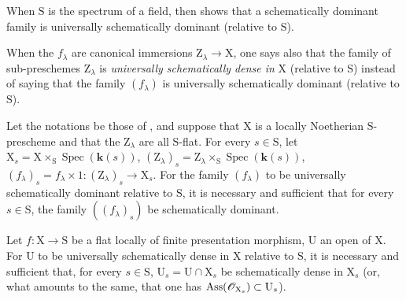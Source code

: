 When $\mathrm{S}$ is the spectrum of a field,  then shows that a schematically dominant family is universally schematically dominant (relative to $\mathrm{S}$).

When the $f_\lambda$ are canonical immersions $\mathrm{Z}_\lambda\to\mathrm{X}$, one says also that the family of sub-preschemes $\mathrm{Z}_\lambda$ is \emph{universally schematically dense in} $\mathrm{X}$ (relative to $\mathrm{S}$) instead of saying that the family $(f_\lambda)$ is universally schematically dominant (relative to $\mathrm{S}$).

\begin{theorem}[11.10.9]
\label{IV.11.10.9}
Let the notations be those of , and suppose that $\mathrm{X}$ is a locally Noetherian $\mathrm{S}$-prescheme and that the $\mathrm{Z}_\lambda$ are all $\mathrm{S}$-flat.
For every $s\in\mathrm{S}$, let $\mathrm{X}_s=\mathrm{X}\times_\mathrm{S}\operatorname{Spec}(\boldsymbol{k}(s))$, $(\mathrm{Z}_\lambda)_s=\mathrm{Z}_\lambda\times_\mathrm{S}\operatorname{Spec}(\boldsymbol{k}(s))$, $(f_\lambda)_s=f_\lambda\times 1:(\mathrm{Z}_\lambda)_s\to\mathrm{X}_s$.
For the family $(f_\lambda)$ to be universally schematically dominant relative to $\mathrm{S}$, it is necessary and sufficient that for every $s\in\mathrm{S}$, the family $((f_\lambda)_s)$ be schematically dominant.
\end{theorem}

\begin{proposition}[11.10.10]
\label{IV.11.10.10}
Let $f:\mathrm{X}\to\mathrm{S}$ be a flat locally of finite presentation morphism, $\mathrm{U}$ an open of $\mathrm{X}$.
For $\mathrm{U}$ to be universally schematically dense in $\mathrm{X}$ relative to $\mathrm{S}$, it is necessary and sufficient that, for every $s\in\mathrm{S}$, $\mathrm{U}_s=\mathrm{U}\cap\mathrm{X}_s$ be schematically dense in $\mathrm{X}_s$ (or, what amounts to the same, that one has $\operatorname{Ass}(\mathscr{O}_{\mathrm{X}_s})\subset\mathrm{U}_s$).
\end{proposition}
